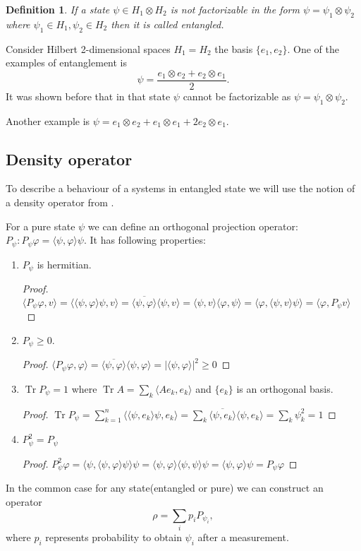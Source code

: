 \documentclass[11pt]{article}
\newtheorem{definition}{Definition}[section]
\DeclareMathOperator{\Tr}{Tr}
\begin{document}
\begin{definition}
If a state $\psi\in H_1\otimes H_2$ is not factorizable in the form $\psi = \psi_1\otimes\psi_2$ where $\psi_1\in H_1, \psi_2\in H_2$ then it is called entangled.
\end{definition}  
Consider Hilbert 2-dimensional spaces $H_1 = H_2$ the basis $\{e_1, e_2\}$. One of the examples of entanglement is 
\[
\psi = \frac{e_1\otimes e_2 + e_2\otimes e_1}{2}.
\]
It was shown before that in that state $\psi$ cannot be factorizable as $\psi = \psi_1\otimes\psi_2$.

Another example is $\psi = e_1\otimes e_2 + e_1 \otimes e_1 + 2e_2 \otimes e_1$.


\subsection{Density operator}

To describe a behaviour of a systems in entangled state we will use the notion of a density operator from \cite{Khrennikov_information}.

For a pure state $\psi$ we can define an orthogonal projection operator: $P_\psi: P_\psi\varphi = \langle \psi, \varphi \rangle \psi$. It has following properties:
\begin{enumerate}
\item $P_\psi$ is hermitian. 
\begin{proof}
$\langle P_\psi\varphi, v\rangle = \langle \langle\psi,\varphi\rangle \psi, v\rangle = \overline{\langle\psi,\varphi\rangle} \langle\psi, v\rangle = \langle\psi, v\rangle \langle\varphi,\psi\rangle  = \langle\varphi, \langle\psi, v\rangle\psi\rangle = \langle\varphi, P_\psi v \rangle$
\end{proof}
\item $P_\psi \geq 0$.
\begin{proof}
$\langle P_\psi\varphi, \varphi\rangle = \overline{\langle\psi,\varphi\rangle} \langle\psi, \varphi\rangle = |\langle\psi, \varphi\rangle|^2 \geq 0$
\end{proof}
\item $\Tr P_\psi = 1$ where $\Tr A = \sum_k \langle Ae_k, e_k\rangle$ and $\{e_k\}$ is an orthogonal basis.
\begin{proof}
$\Tr P_\psi = \sum_{k = 1}^n \langle \langle \psi, e_k\rangle\psi, e_k\rangle = \sum_k \overline{\langle\psi, e_k\rangle}\langle\psi, e_k\rangle = \sum_k\psi_k^2 = 1$
\end{proof}
\item $P_\psi^2 = P_\psi$
\begin{proof}
$P_\psi^2\varphi = \langle\psi, \langle\psi, \varphi\rangle \psi\rangle \psi = \langle\psi, \varphi\rangle \langle\psi, \psi\rangle\psi = \langle\psi, \varphi\rangle\psi = P_\psi\varphi $
\end{proof}
\end{enumerate}
In the common case for any state(entangled or pure) we can construct an operator
\[
\rho = \sum_ip_iP_{\psi_i},
\]
where $p_i$ represents probability to obtain $\psi_i$ after a measurement.
\end{document}
